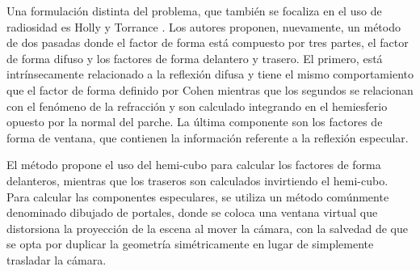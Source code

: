 Una formulación distinta del problema, que también se focaliza en el uso de radiosidad es Holly y Torrance \cite{Holly}. Los autores proponen, nuevamente, un método de dos pasadas donde el factor de forma está compuesto por tres partes, el factor de forma difuso y los factores de forma delantero y trasero. El primero, está intrínsecamente relacionado a la reflexión difusa y tiene el mismo comportamiento que el factor de forma definido por Cohen \cite{Cohen} mientras que los segundos se relacionan con el fenómeno de la refracción y son calculado integrando en el hemiesferio opuesto por la normal del parche. La última componente son los factores de forma de ventana, que contienen la información referente a la reflexión especular.

El método propone el uso del hemi-cubo para calcular los factores de forma delanteros, mientras que los traseros son calculados invirtiendo el hemi-cubo. Para calcular las componentes especulares, se utiliza un método comúnmente denominado dibujado de portales, donde se coloca una ventana virtual que distorsiona la proyección de la escena al mover la cámara, con la salvedad de que se opta por duplicar la geometría simétricamente en lugar de simplemente trasladar la cámara.